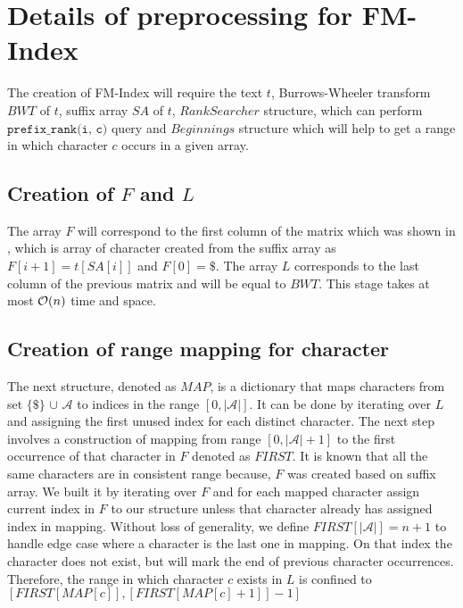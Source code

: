 \section{Details of preprocessing for FM-Index}

The creation of FM-Index will require the text $t$, Burrows-Wheeler transform $BWT$ of $t$, suffix array $SA$ of $t$, $RankSearcher$ structure, which can perform $\texttt{prefix\_rank(i, c)}$ query and $Beginnings$ structure which will help to get a range in which character $c$ occurs in a given array.

\subsection{Creation of $F$ and $L$}

The array $F$ will correspond to the first column of the matrix which was shown in , which is array of character created from the suffix array as $F[i+1] = t[SA[i]]$ and $F[0] = \$$. The array $L$ corresponds to the last column of the previous matrix and will be equal to $BWT$. This stage takes at most $\mathcal{O}(n)$ time and space.

\subsection{Creation of range mapping for character}

The next structure, denoted as $MAP$, is a dictionary that maps characters from set $\{\$\}$ $\cup$ $\mathcal{A}$ to indices in the range $[0, |\mathcal{A}|]$. It can be done by iterating over $L$ and assigning the first unused index for each distinct character.
\newline \newline \newline
The next step involves a construction of mapping from range $[0, |\mathcal{A}| + 1]$ to the first occurrence of that character in $F$ denoted as $FIRST$. It is known that all the same characters are in consistent range because, $F$ was created based on suffix array. We built it by iterating over $F$ and for each mapped character assign current index in $F$ to our structure unless that character already has assigned index in mapping. Without loss of generality, we define $FIRST[|\mathcal{A}|] = n + 1$ to handle edge case where a character is the last one in mapping. On that index the character does not exist, but will mark the end of previous character occurrences. Therefore, the range in which character $c$ exists in $L$ is confined to $[ FIRST[ MAP[ c ] ], 
 [ FIRST[ MAP[ c ] + 1 ] ] - 1 ]$

